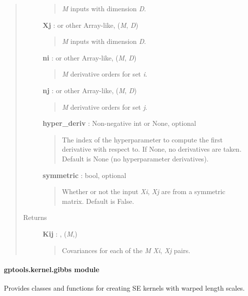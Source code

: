 \documentclass[letterpaper,10pt,english]{sphinxmanual}
\begin{document}
\begin{fulllineitems}
\begin{fulllineitems}
\begin{quote}
\begin{description}
\begin{quote}
\emph{M} inputs with dimension \emph{D}.
\end{quote}

\textbf{Xj} :  or other Array-like, (\emph{M}, \emph{D})
\begin{quote}

\emph{M} inputs with dimension \emph{D}.
\end{quote}

\textbf{ni} :  or other Array-like, (\emph{M}, \emph{D})
\begin{quote}

\emph{M} derivative orders for set \emph{i}.
\end{quote}

\textbf{nj} :  or other Array-like, (\emph{M}, \emph{D})
\begin{quote}

\emph{M} derivative orders for set \emph{j}.
\end{quote}

\textbf{hyper\_deriv} : Non-negative int or None, optional
\begin{quote}

The index of the hyperparameter to compute the first derivative
with respect to. If None, no derivatives are taken. Default is None
(no hyperparameter derivatives).
\end{quote}

\textbf{symmetric} : bool, optional
\begin{quote}

Whether or not the input \emph{Xi}, \emph{Xj} are from a symmetric matrix.
Default is False.
\end{quote}

\item[{Returns}] \leavevmode
\textbf{Kij} : , (\emph{M},)
\begin{quote}

Covariances for each of the \emph{M} \emph{Xi}, \emph{Xj} pairs.
\end{quote}

\end{description}\end{quote}

\end{fulllineitems}


\end{fulllineitems}



\paragraph{gptools.kernel.gibbs module}
\label{gptools.kernel:module-gptools.kernel.gibbs}\label{gptools.kernel:gptools-kernel-gibbs-module}
Provides classes and functions for creating SE kernels with warped length scales.
\end{document}
